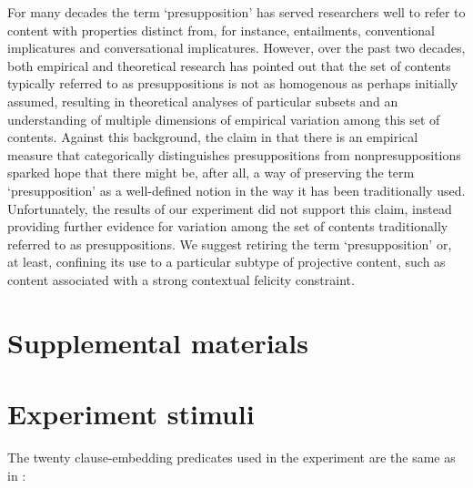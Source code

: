 \documentclass[11pt,fleqn]{article}
\newcommand{\6}{\mbox{$[\hspace*{-.6mm}[$}}
\newcommand{\9}{\mbox{$]\hspace*{-.6mm}]$}}
\begin{document}
For many decades the term `presupposition' has served researchers well to refer to content with properties distinct from, for instance, entailments, conventional implicatures and conversational implicatures. However, over the past two decades, both empirical and theoretical research has pointed out that the set of contents typically referred to as presuppositions is not as homogenous as perhaps initially assumed, resulting in theoretical analyses of particular subsets and an understanding of multiple dimensions of empirical variation among this set of contents. Against this background, the claim in \citealt{mandelkern-etal2020} that there is an empirical measure that categorically distinguishes presuppositions from nonpresuppositions sparked hope that there might be, after all, a way of preserving the term `presupposition' as a well-defined notion in the way it has been traditionally used.  Unfortunately, the results of our experiment did not support this claim, instead providing further evidence for variation among the set of contents traditionally referred to as presuppositions. We suggest retiring the term `presupposition' or, at least, confining its use to a particular subtype of projective content, such as content associated with a strong contextual felicity constraint.






%


\newpage

\section*{Supplemental materials}

\appendix

\setcounter{page}{1}

\setcounter{table}{0}
\renewcommand{\thetable}{A\arabic{table}}

\setcounter{figure}{0}
\renewcommand{\thefigure}{A\arabic{figure}}

\section{Experiment stimuli}\label{a:clauses}

The twenty clause-embedding predicates used in the experiment are the same as in \citealt{degen-tonhauser-openmind,degen-tonhauser-language}:
\end{document}
